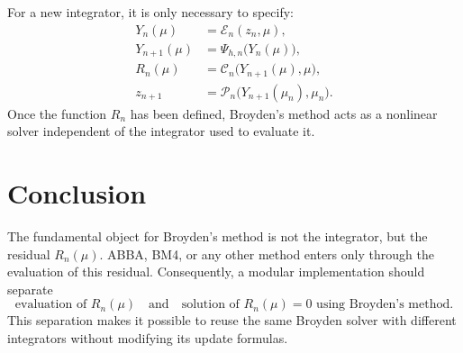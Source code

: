 \documentclass[11pt,a4paper]{article}
\begin{document}
For a new integrator, it is only necessary to specify:
\begin{equation}
\boxed{
\begin{aligned}
    Y_n(\mu)      &=\mathcal E_n(z_n,\mu),\\
    Y_{n+1}(\mu)  &=\Psi_{h,n}\bigl(Y_n(\mu)\bigr),\\
    R_n(\mu)      &=\mathcal C_n\bigl(Y_{n+1}(\mu),\mu\bigr),\\
    z_{n+1}       &=\mathcal P_n\bigl(Y_{n+1}(\mu_n),\mu_n\bigr).
\end{aligned}}
\end{equation}
Once the function $R_n$ has been defined, Broyden's method acts as a nonlinear
solver independent of the integrator used to evaluate it.

\section{Conclusion}

The fundamental object for Broyden's method is not the integrator, but the
residual $R_n(\mu)$. ABBA, BM4, or any other method enters only through the
evaluation of this residual. Consequently, a modular implementation should
separate
\[
    \boxed{
    \text{evaluation of }R_n(\mu)
    \quad\text{and}\quad
    \text{solution of }R_n(\mu)=0\text{ using Broyden's method}.}
\]
This separation makes it possible to reuse the same Broyden solver with
different integrators without modifying its update formulas.
\end{document}
